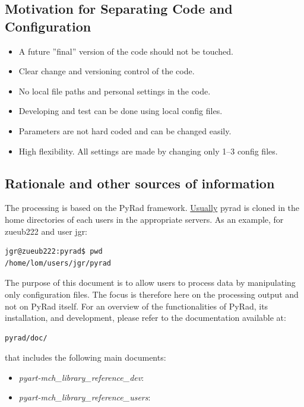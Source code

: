 \documentclass[a4paper,11pt,pdftex,twoside]{scrartcl}
\begin{document}
\subsection{Motivation for Separating Code and Configuration}
\begin{itemize}
  \item A future ''final'' version of the code should not be touched.
  \item Clear change and versioning control of the code.
  \item No local file paths and personal settings in the code.
  \item Developing and test can be done using local config files.
  \item Parameters are not hard coded and can be changed easily.
  \item High flexibility. All settings are made by changing only 1--3
    config files.
\end{itemize}

\subsection{Rationale and other sources of information}
The processing is based on the PyRad framework. \underline{Usually} pyrad is cloned in the home directories of each users in the appropriate servers. As an example, for zueub222 and user jgr:

\begin{verbatim}
jgr@zueub222:pyrad$ pwd
/home/lom/users/jgr/pyrad
\end{verbatim} 

The purpose of this document is to allow users to process data by manipulating only configuration files. The focus is therefore here on the processing output and not on PyRad itself. For an overview of the functionalities of PyRad, its installation, and development, please refer to the documentation available at:

\begin{verbatim}
pyrad/doc/
\end{verbatim}

that includes the following main documents:
\begin{itemize}
   \item {\it pyart-mch\_library\_reference\_dev}:
   \item {\it pyart-mch\_library\_reference\_users}:
\end{itemize}

\newpage
\end{document}
